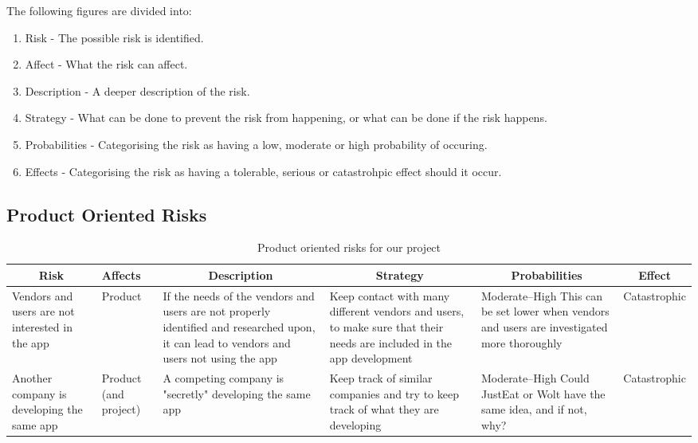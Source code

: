 The following figures are divided into:
\begin{enumerate}
  \item Risk - The possible risk is identified.
  \item Affect - What the risk can affect.
  \item Description - A deeper description of the risk.
  \item Strategy - What can be done to prevent the risk from happening, or what can be done if the risk happens.
  \item Probabilities - Categorising the risk as having a low, moderate or high probability of occuring.
  \item Effects - Categorising the risk as having a tolerable, serious or catastrohpic effect should it occur.
\end{enumerate}

\subsection{Product Oriented Risks}

\begin{table}[h!]
\centering
\begin{tabular}{@{}p{}p{}p{}p{}p{}c@{}}\toprule
\multicolumn{1}{c}{\textbf{Risk}}
& \textbf{Affects}
& \multicolumn{1}{c}{\textbf{Description}}                                                                                                  & \multicolumn{1}{c}{\textbf{Strategy}}                                                                                 & \multicolumn{1}{c}{\textbf{Probabilities}}                                                   & \textbf{Effect} \\ \midrule
Vendors and users are not interested in the app
& Product
& If the needs of the vendors and users are not properly identified and researched upon, it can lead to vendors and users not using the app
& Keep contact with many different vendors and users, to make sure that their needs are included in the app development
& Moderate--High This can be set lower when vendors and users are investigated more thoroughly & Catastrophic    \\ \midrule
Another company is developing the same app
& Product (and project) & A competing company is "secretly" developing the same app                                                                                 & Keep track of similar companies and try to keep track of what they are developing                                     & Moderate--High Could JustEat or Wolt have the same idea, and if not, why?                    & Catastrophic    \\ \bottomrule
\end{tabular}
\caption{Product oriented risks for our project}
\label{table_product_risks}
\end{table}
\pagebreak
